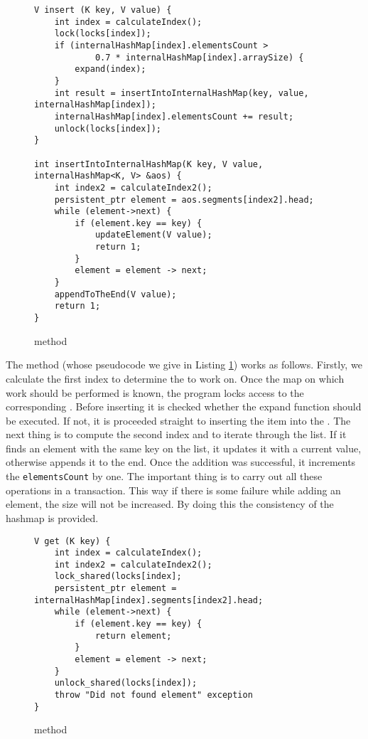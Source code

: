 \begin{figure}[ht]
\renewcommand{\figurename}{Listing}
\begin{lstlisting}
V insert (K key, V value) {
    int index = calculateIndex();
    lock(locks[index]);
    if (internalHashMap[index].elementsCount > 
            0.7 * internalHashMap[index].arraySize) {
        expand(index);
    }
    int result = insertIntoInternalHashMap(key, value, internalHashMap[index]);
    internalHashMap[index].elementsCount += result;
    unlock(locks[index]);
}
    
int insertIntoInternalHashMap(K key, V value, internalHashMap<K, V> &aos) {
    int index2 = calculateIndex2();
    persistent_ptr element = aos.segments[index2].head;
    while (element->next) {
        if (element.key == key) {
            updateElement(V value);
            return 1;
        } 
        element = element -> next;
    }
    appendToTheEnd(V value);
    return 1;
}
\end{lstlisting}
\renewcommand{\figurename}{Listing}
\caption{\insertMethod method}
\label{insertMethod}
\end{figure}
        The \insertMethod method (whose pseudocode we give in Listing \ref{insertMethod}) works as follows.
        Firstly, we calculate the first index to determine the \internalHashMap to work on.  
        Once the map on which work should be performed is known, the program locks access to the corresponding \internalHashMap. 
        Before inserting it is checked whether the expand function should be executed. 
        If not, it is proceeded straight to inserting the item into the \internalHashMap. 
        The next thing is to compute the second index and to iterate through the list. 
        If it finds an element with the same key on the list, it updates it with a current value, otherwise appends it to the end.
        Once the addition was successful, it increments the \texttt{elementsCount} by one. 
        The important thing is to carry out all these operations in a transaction. 
        This way if there is some failure while adding an element, the size will not be increased. 
        By doing this the consistency of the hashmap is provided.
        
\begin{figure}[ht]
\renewcommand{\figurename}{Listing}
\begin{lstlisting}
V get (K key) {
    int index = calculateIndex();
    int index2 = calculateIndex2();
    lock_shared(locks[index];
    persistent_ptr element = internalHashMap[index].segments[index2].head;
    while (element->next) {
        if (element.key == key) {
            return element;
        }
        element = element -> next;
    }
    unlock_shared(locks[index]);
    throw "Did not found element" exception
}
\end{lstlisting}
\caption{\getMethod method}
\label{getMethod}
\end{figure}

